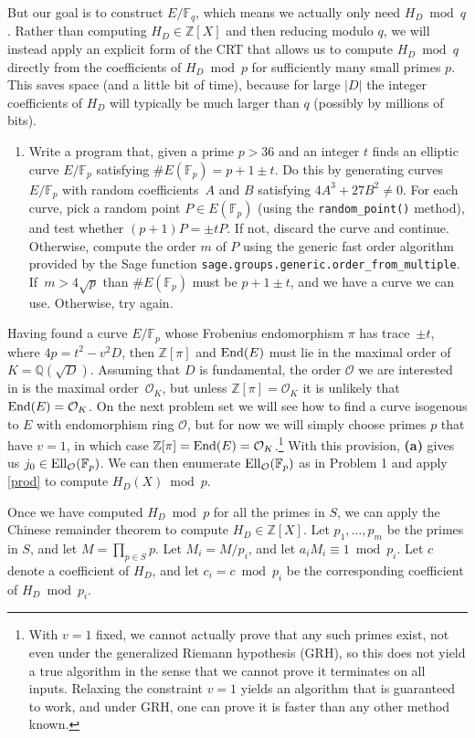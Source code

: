 \documentclass[11pt]{article}
\newcommand{\Fp}{\mathbb{F}_p}
\newcommand{\Fq}{\mathbb{F}_q}
\newcommand{\Q}{\mathbb{Q}}
\newcommand{\Z}{\mathbb{Z}}
\newcommand{\End}{{\rm End}}
\renewcommand{\O}{\mathcal{O}}
\newcommand{\EllO}{{\rm Ell}_\O}
\begin{document}
But our goal is to construct $E/\Fq$, which means we actually only need $H_D\bmod q$.  Rather than computing $H_D\in \Z[X]$ and then reducing modulo $q$, we will instead apply an explicit form of the CRT that allows us to compute $H_D\bmod q$ directly from the coefficients of $H_D\bmod p$ for sufficiently many small primes $p$.  This saves space (and a little bit of time), because for large $|D|$ the integer coefficients of $H_D$ will typically be much larger than $q$ (possibly by millions of bits).

\begin{enumerate}[{\bf (a)}]
\item Write a program that, given a prime $p>36$ and an integer $t$ finds an elliptic curve $E/\Fp$ satisfying $\#E(\Fp)=p+1\pm t$.
Do this by generating curves $E/\Fp$ with random coefficients~$A$ and $B$ satisfying $4A^3+27B^2\ne 0$.
For each curve, pick a random point $P\in E(\Fp)$ (using the \texttt{random\_point()} method), and test whether $(p+1)P=\pm tP$.
If not, discard the curve and continue.  Otherwise, compute the order $m$ of $P$ using the generic fast order algorithm provided by the Sage function \texttt{sage.groups.generic.order\_from\_multiple}.
If~$m>4\sqrt{p}$ than $\#E(\Fp)$ must be $p+1\pm t$, and we have a curve we can use.
Otherwise, try again.
\end{enumerate}

Having found a curve $E/\Fp$ whose Frobenius endomorphism $\pi$ has trace~$\pm t$, where $4p=t^2-v^2D$, then $\Z[\pi]$ and $\End(E)$ must lie in the maximal order of $K=\Q(\sqrt{D})$.  Assuming that $D$ is fundamental, the order $\O$ we are interested in is the maximal order~$\O_K$, but unless $\Z[\pi]=\O_K$ it is unlikely that $\End(E)=\O_K$.  On the next problem set we will see how to find a curve isogenous to $E$ with endomorphism ring $\O$, but for now we will simply choose primes $p$ that have $v=1$, in which case $\Z[\pi]=\End(E)=\O_K$.\footnote{With $v=1$ fixed, we cannot actually prove that any such primes exist, not even under the generalized Riemann hypothesis (GRH), so this does not yield a true algorithm in the sense that we cannot prove it terminates on all inputs.  Relaxing the constraint $v=1$ yields an algorithm that is guaranteed to work, and under GRH, one can prove it is faster than any other method known.}
With this provision, \textbf{(a)} gives us $j_0\in\EllO(\Fp)$.
We can then enumerate $\EllO(\Fp)$ as in Problem 1 and apply \eqref{prod} to compute $H_D(X)\bmod p$.

Once we have computed $H_D\bmod p$ for all the primes in $S$, we can apply the Chinese remainder theorem to compute $H_D\in\Z[X]$.
Let $p_1,\ldots,p_m$ be the primes in $S$, and let $M=\prod_{p\in S} p$.
Let $M_i=M/p_i$, and let $a_iM_i\equiv 1 \bmod p_i$.
Let $c$ denote a coefficient of $H_D$, and let $c_i=c\bmod p_i$ be the corresponding coefficient of $H_D\bmod p_i$.
\end{document}
